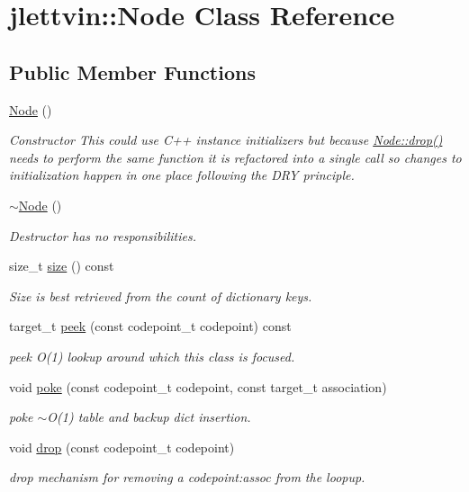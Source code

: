 \hypertarget{classjlettvin_1_1_node}{}\section{jlettvin\+:\+:Node Class Reference}
\label{classjlettvin_1_1_node}
\subsection*{Public Member Functions}
\begin{DoxyCompactItemize}
\item 
\hyperlink{classjlettvin_1_1_node_ad7a34779cad45d997bfd6d3d8043c75f}{Node} ()
\begin{DoxyCompactList}\small\item\em Constructor This could use C++ instance initializers but because \hyperlink{classjlettvin_1_1_node_a516768e6fc7505a9e96d9ade87f11148}{Node\+::drop()} needs to perform the same function it is refactored into a single call so changes to initialization happen in one place following the D\+R\+Y principle. \end{DoxyCompactList}\item 
\hyperlink{classjlettvin_1_1_node_aa0840c3cb5c7159be6d992adecd2097c}{$\sim$\+Node} ()
\begin{DoxyCompactList}\small\item\em Destructor has no responsibilities. \end{DoxyCompactList}\item 
size\+\_\+t \hyperlink{classjlettvin_1_1_node_ae2983972c965d0875ea34aa15aee2564}{size} () const 
\begin{DoxyCompactList}\small\item\em Size is best retrieved from the count of dictionary keys. \end{DoxyCompactList}\item 
target\+\_\+t \hyperlink{classjlettvin_1_1_node_a976b319d4793fcc839604d62987fe01e}{peek} (const codepoint\+\_\+t codepoint) const 
\begin{DoxyCompactList}\small\item\em peek O(1) lookup around which this class is focused. \end{DoxyCompactList}\item 
void \hyperlink{classjlettvin_1_1_node_a599100f6c058d238fb28f15a60d3ae9f}{poke} (const codepoint\+\_\+t codepoint, const target\+\_\+t association)
\begin{DoxyCompactList}\small\item\em poke $\sim$\+O(1) table and backup dict insertion. \end{DoxyCompactList}\item 
void \hyperlink{classjlettvin_1_1_node_a516768e6fc7505a9e96d9ade87f11148}{drop} (const codepoint\+\_\+t codepoint)
\begin{DoxyCompactList}\small\item\em drop mechanism for removing a codepoint\+:assoc from the loopup. \end{DoxyCompactList}\end{DoxyCompactItemize}


